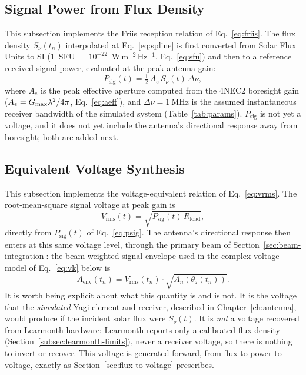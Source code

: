 \subsection{Signal Power from Flux Density}
\label{subsec:signal-power}

This subsection implements the Friis reception relation of
Eq.~\eqref{eq:friis}. The flux density $S_\nu(t_n)$ interpolated at
Eq.~\eqref{eq:spline} is first converted from Solar Flux Units to SI
(1~SFU $= 10^{-22}$~W\,m$^{-2}$\,Hz$^{-1}$, Eq.~\eqref{eq:sfu}) and then to a
reference received signal power, evaluated at the peak antenna gain:
\begin{equation}
  P_{\mathrm{sig}}(t) = \tfrac{1}{2}\,A_e\,S_\nu(t)\,\Delta\nu,
  \label{eq:psig}
\end{equation}
where $A_e$ is the peak effective aperture computed from the 4NEC2 boresight
gain ($A_e = G_{\rm max}\lambda^2/4\pi$, Eq.~\eqref{eq:aeff}), and
$\Delta\nu = \SI{1}{\mega\hertz}$ is the assumed instantaneous receiver
bandwidth of the simulated system (Table~\ref{tab:params}). $P_\mathrm{sig}$
is not yet a voltage, and it does not yet include the antenna's directional
response away from boresight; both are added next.

\subsection{Equivalent Voltage Synthesis}
\label{subsec:voltage-synth-detail}

This subsection implements the voltage-equivalent relation of
Eq.~\eqref{eq:vrms}. The root-mean-square signal voltage at peak gain is
\begin{equation}
  V_{\mathrm{rms}}(t) = \sqrt{P_{\mathrm{sig}}(t)\,R_{\mathrm{load}}},
\end{equation}
directly from $P_\mathrm{sig}(t)$ of Eq.~\eqref{eq:psig}. The antenna's
directional response then enters at this same voltage level, through the
primary beam of Section~\ref{sec:beam-integration}: the beam-weighted signal
envelope used in the complex voltage model of Eq.~\eqref{eq:vk} below is
\begin{equation}
  A_\mathrm{env}(t_n) = V_\mathrm{rms}(t_n)\cdot\sqrt{A_n(\theta_z(t_n))} .
\end{equation}
It is worth being explicit about what this quantity is and is not. It is the
voltage that the \emph{simulated} Yagi element and receiver, described in
Chapter~\ref{ch:antenna}, would produce if the incident solar flux were
$S_\nu(t)$. It is \emph{not} a voltage recovered from Learmonth hardware:
Learmonth reports only a calibrated flux density
(Section~\ref{subsec:learmonth-limits}), never a receiver voltage, so there
is nothing to invert or recover. This voltage is generated forward, from
flux to power to voltage, exactly as Section~\ref{sec:flux-to-voltage}
prescribes.

